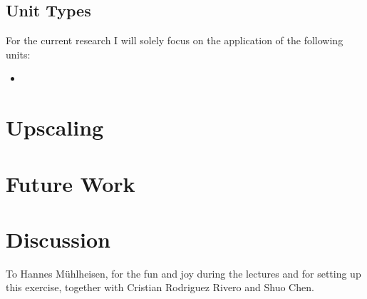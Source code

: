 \documentclass[sigchi, nonacm]{acmart}
\begin{document}
\subsection{Unit Types}
For the current research I will solely focus on the application of the following units:
\begin{itemize}
    \item 
\end{itemize}



\section{Upscaling}




\section{Future Work}

\section{Discussion}


\begin{acks}
To Hannes Mühlheisen, for the fun and joy during the lectures and for setting up this exercise, together with Cristian Rodriguez Rivero and Shuo Chen.
\end{acks}





\appendix
\end{document}
